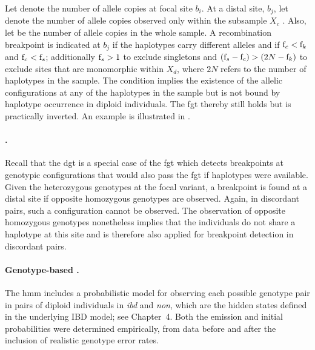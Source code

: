 %

%

Let \fk{} denote the number of allele copies at focal site $b_i$.
At a distal site, $b_j$, let  denote the number of allele copies observed only within the subsample $X_c$ .
Also, let  be the number of allele copies  in the whole sample.
A recombination breakpoint is indicated at $b_j$ if the  haplotypes carry different alleles and if ${\fk{c} < \fk{}}$ and ${\fk{c} < \fk{s}}$; additionally ${\fk{s} > 1}$ to exclude singletons and ${(\fk{s} - \fk{c}) > (2N - \fk{})}$ to exclude sites that are monomorphic within $X_d$, where $2N$ refers to the number of haplotypes in the sample.
The condition implies the existence of the  allelic configurations at any of the haplotypes in the sample but is not bound by haplotype occurrence in  diploid individuals.
The \gls{fgt} thereby still holds but is practically inverted.
An example is illustrated in .


\paragraph{.}
Recall that the \gls{dgt} is a special case of the \gls{fgt} which detects breakpoints at genotypic configurations that would also pass the \gls{fgt} if haplotypes were available.
Given the  heterozygous genotypes at the focal variant, a breakpoint is found at a distal site if opposite homozygous genotypes are observed.
Again, in discordant pairs, such a configuration cannot be observed.
The observation of opposite homozygous genotypes nonetheless implies that the  individuals do not share a haplotype at this site and is therefore also applied for breakpoint detection in discordant pairs.

%

%

\paragraph{Genotype-based .}
The \gls{hmm} includes a probabilistic model for observing each possible genotype pair in pairs of diploid individuals in \emph{ibd} and \emph{non}, which are the hidden states defined in the underlying IBD model; see Chapter~4.
Both the emission and initial probabilities were determined empirically, from data before and after the inclusion of realistic genotype error rates.


